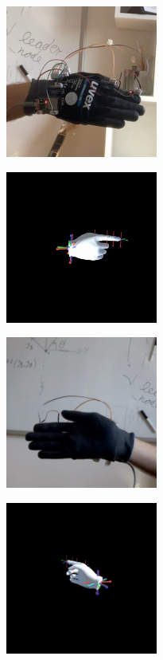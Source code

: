 \begin{figure}
 \centering
 \begin{subfigure}[ht]{0.3\textwidth}
     \centering
     \includegraphics[width=5cm,height=5cm]{immagini/confronto/5_real.jpg}
     \caption{}
 \end{subfigure}
 \begin{subfigure}[ht]{0.3\textwidth}
     \includegraphics[width=5cm,height=5cm]{immagini/confronto/5_sym.jpg}
     \caption{}
 \end{subfigure}
 \caption{}
\end{figure}

\begin{figure}
 \centering
 \begin{subfigure}[ht]{0.3\textwidth}
     \centering
     \includegraphics[width=5cm,height=5cm]{immagini/confronto/6_real.jpg}
     \caption{}
 \end{subfigure}
 \begin{subfigure}[ht]{0.3\textwidth}
     \includegraphics[width=5cm,height=5cm]{immagini/confronto/6_sym.jpg}
     \caption{}
 \end{subfigure}
 \caption{}
\end{figure}

